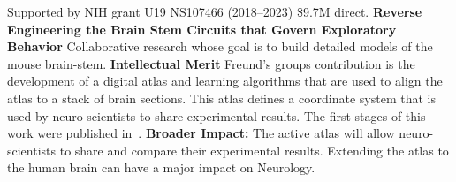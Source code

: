  Supported by NIH grant U19 NS107466 (2018--2023) \$9.7M direct. {\bf Reverse Engineering the Brain Stem Circuits that Govern Exploratory Behavior}  Collaborative research whose goal is to build detailed models of the mouse brain-stem. {\bf Intellectual Merit}  Freund's groups contribution is the development of a digital atlas and learning algorithms that are used to align the atlas to a stack of brain sections. This atlas defines a coordinate system that is used by neuro-scientists to share experimental results. The first stages of this work were published in~\cite{ChenEtAl2019}. {\bf Broader Impact:} The active atlas will allow neuro-scientists to share and compare their experimental results. Extending the atlas to the human brain can have a major impact on Neurology.


